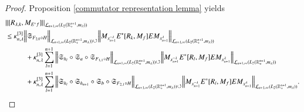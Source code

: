 \documentclass[12pt]{amsart}
\begin{document}
\begin{proof} Proposition \ref{commutator representation lemma} yields
\begin{align*}
&\|[R_{\lambda,k},M_{E^{\ast}f}]\|_{\mathcal{L}_{n+1,\infty}(L_2(\mathbb{R}^{n+1}_+,m_{\lambda}))}\\
&\leq \kappa_{n,\lambda}^{[3]}\Big\|\mathfrak{S}_{F_{2,0}\circ H}\Big\|_{\mathcal{L}_{n+1,\infty}(L_2(\mathbb{R}^{n+1}_+,m_{\lambda}))\circlearrowleft}\Big\| M_{x_{n+1}^{-\lambda}} E^{\ast}[R_k,M_f]E M_{x_{n+1}^{\lambda}}\Big\|_{\mathcal{L}_{n+1,\infty}(L_2(\mathbb{R}^{n+1}_+,m_{\lambda}))}\\
&\hspace{1.0cm}+\kappa_{n,\lambda}^{[3]}\sum_{l=1}^{n+1}\Big\|\mathfrak{S}_{h_l}\circ\mathfrak{S}_a\circ\mathfrak{S}_{F_{1,1}\circ H}\Big\|_{\mathcal{L}_{n+1,\infty}(L_2(\mathbb{R}^{n+1}_+,m_{\lambda}))\circlearrowleft}\Big\|M_{x_{n+1}^{-\lambda}} E^{\ast}[R_l,M_f]E M_{x_{n+1}^{\lambda}}\Big\|_{\mathcal{L}_{n+1,\infty}(L_2(\mathbb{R}^{n+1}_+,m_{\lambda}))}\\
&\hspace{1.0cm}+\kappa_{n,\lambda}^{[3]}\sum_{l=1}^{n+1}\Big\|\mathfrak{S}_{h_l}\circ\mathfrak{S}_{h_{n+1}}\circ\mathfrak{S}_b\circ\mathfrak{S}_{F_{2,1}\circ H}\Big\|_{\mathcal{L}_{n+1,\infty}(L_2(\mathbb{R}^{n+1}_+,m_{\lambda}))\circlearrowleft}\Big\|M_{x_{n+1}^{-\lambda}} E^{\ast}[R_l,M_f]E M_{x_{n+1}^{\lambda}}\Big\|_{\mathcal{L}_{n+1,\infty}(L_2(\mathbb{R}^{n+1}_+,m_{\lambda}))}.
\end{align*}

\end{proof}
\end{document}
